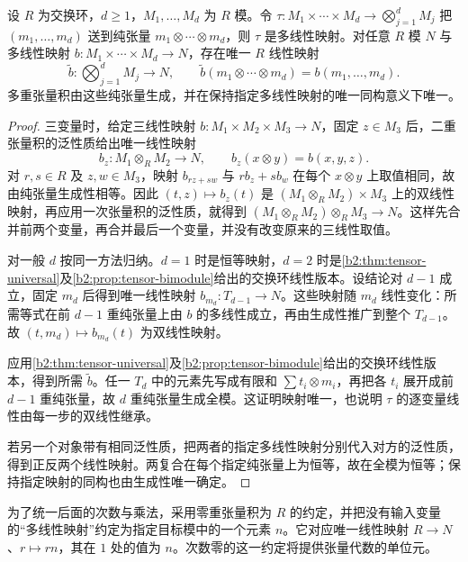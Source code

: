 \begin{theorem}[多重张量积的泛性质]\label{b2:thm:multiple-tensor-universal}
	设 \(R\) 为交换环，\(d\ge1\)，\(M_1,\ldots,M_d\) 为 \(R\) 模。令 \(\tau:M_1\times\cdots\times M_d\to\bigotimes_{j=1}^dM_j\) 把 \((m_1,\ldots,m_d)\) 送到纯张量 \(m_1\otimes\cdots\otimes m_d\)，则 \(\tau\) 是多线性映射。对任意 \(R\) 模 \(N\) 与多线性映射 \(b:M_1\times\cdots\times M_d\rightarrow N\)，存在唯一 \(R\) 线性映射
	\[
		\widetilde b:\bigotimes_{j=1}^dM_j\longrightarrow N, \qquad \widetilde b(m_1\otimes\cdots\otimes m_d)=b(m_1,\ldots,m_d).
	\]
	多重张量积由这些纯张量生成，并在保持指定多线性映射的唯一同构意义下唯一。
\end{theorem}
\begin{proof}
	三变量时，给定三线性映射 \(b:M_1\times M_2\times M_3\rightarrow N\)，固定 \(z\in M_3\) 后，二重张量积的泛性质给出唯一线性映射
	\[
		b_z:M_1\otimes_RM_2\longrightarrow N, \qquad b_z(x\otimes y)=b(x,y,z).
	\]
	对 \(r,s\in R\) 及 \(z,w\in M_3\)，映射 \(b_{rz+sw}\) 与 \(r b_z+s b_w\) 在每个 \(x\otimes y\) 上取值相同，故由纯张量生成性相等。因此 \((t,z)\mapsto b_z(t)\) 是 \((M_1\otimes_RM_2)\times M_3\) 上的双线性映射，再应用一次张量积的泛性质，就得到 \((M_1\otimes_RM_2)\otimes_RM_3\rightarrow N\)。这样先合并前两个变量，再合并最后一个变量，并没有改变原来的三线性取值。

	对一般 \(d\) 按同一方法归纳。\(d=1\) 时是恒等映射，\(d=2\) 时是\cref{b2:thm:tensor-universal}及\cref{b2:prop:tensor-bimodule}给出的交换环线性版本。设结论对 \(d-1\) 成立，固定 \(m_d\) 后得到唯一线性映射 \(b_{m_d}:T_{d-1}\rightarrow N\)。这些映射随 \(m_d\) 线性变化：所需等式在前 \(d-1\) 重纯张量上由 \(b\) 的多线性成立，再由生成性推广到整个 \(T_{d-1}\)。故 \((t,m_d)\mapsto b_{m_d}(t)\) 为双线性映射。

	应用\cref{b2:thm:tensor-universal}及\cref{b2:prop:tensor-bimodule}给出的交换环线性版本，得到所需 \(\widetilde b\)。任一 \(T_d\) 中的元素先写成有限和 \(\sum t_i\otimes m_i\)，再把各 \(t_i\) 展开成前 \(d-1\) 重纯张量，故 \(d\) 重纯张量生成全模。这证明映射唯一，也说明 \(\tau\) 的逐变量线性由每一步的双线性继承。

	若另一个对象带有相同泛性质，把两者的指定多线性映射分别代入对方的泛性质，得到正反两个线性映射。两复合在每个指定纯张量上为恒等，故在全模为恒等；保持指定映射的同构也由生成性唯一确定。
\end{proof}

为了统一后面的次数与乘法，采用零重张量积为 \(R\) 的约定，并把没有输入变量的“多线性映射”约定为指定目标模中的一个元素 \(n\)。它对应唯一线性映射 \(R\rightarrow N\)、\(r\mapsto rn\)，其在 \(1\) 处的值为 \(n\)。次数零的这一约定将提供张量代数的单位元。

